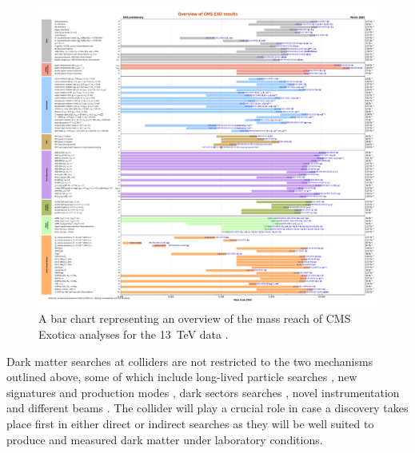 \begin{figure}[ht!]
    \centering
    \includegraphics[width=0.9\linewidth]{figures/DMOverview/CurrentBarChartVersion_v14.pdf}
    \caption[A bar chart representing an overview of the mass reach of CMS analyses.]{A bar chart representing an overview of the mass reach of CMS Exotica analyses for the 13~TeV data \cite{CMS-MassReach}.}
    \label{fig:CMS-MassReach}
\end{figure}

Dark matter searches at colliders are not restricted to the two mechanisms outlined above, some of which include long-lived particle searches \cite{Mitsou:2021tti}, new signatures and production modes \cite{Dienes:2021cxr,tcarter:thesis}, dark sectors searches \cite{Cohen:2017pzm,ajaspan:thesis}, novel instrumentation and different beams \cite{Feng:2017uoz,Batell:2014mga}. The collider will play a crucial role in case a discovery takes place first in either direct or indirect searches as they will be well suited to produce and measured dark matter under laboratory conditions.

